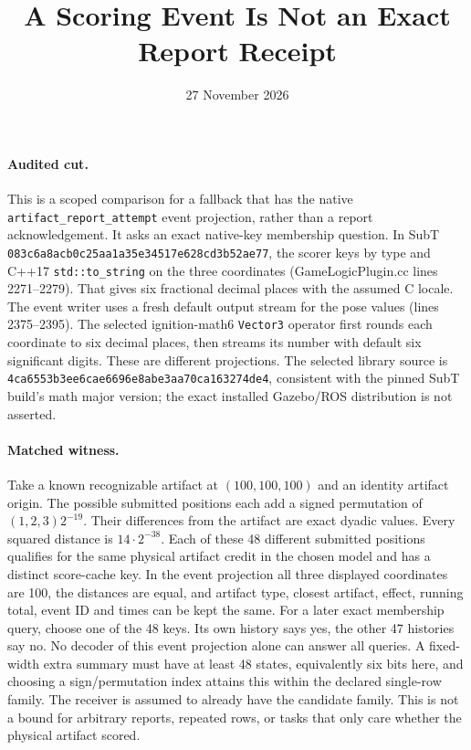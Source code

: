 \documentclass[11pt]{article}
\title{A Scoring Event Is Not an Exact Report Receipt}
\date{27 November 2026}
\begin{document}
\maketitle
\paragraph{Audited cut.} This is a scoped comparison for a
fallback that has the native \texttt{artifact\_report\_attempt}
event projection, rather than a report acknowledgement. It asks
an exact native-key membership question. In SubT
\texttt{083c6a8acb0c25aa1a35e34517e628cd3b52ae77}, the scorer keys
by type and C++17 \texttt{std::to\_string} on the three coordinates
(GameLogicPlugin.cc lines 2271--2279). That gives six fractional
decimal places with the assumed C locale. The event writer uses a
fresh default output stream for the pose values (lines 2375--2395).
The selected ignition-math6 \texttt{Vector3} operator first rounds
each coordinate to six decimal places, then streams its number
with default six significant digits. These are different
projections. The selected library source is
\texttt{4ca6553b3ee6cae6696e8abe3aa70ca163274de4}, consistent with
the pinned SubT build's math major version; the exact installed
Gazebo/ROS distribution is not asserted.

\paragraph{Matched witness.} Take a known recognizable artifact
at $(100,100,100)$ and an identity artifact origin. The possible
submitted positions each add a signed permutation of
$(1,2,3)2^{-19}$. Their differences from the artifact are exact
dyadic values. Every squared distance is $14\cdot 2^{-38}$.
Each of these 48 different submitted positions qualifies for the
same physical artifact credit in the chosen model and has a
distinct score-cache key. In the event projection all three
displayed coordinates are 100, the distances are equal, and
artifact type, closest artifact, effect, running total, event ID
and times can be kept the same. For a later exact membership
query, choose one of the 48 keys. Its own history says yes, the
other 47 histories say no. No decoder of this event projection
alone can answer all queries. A fixed-width extra summary must
have at least 48 states, equivalently six bits here, and choosing a
sign/permutation index attains this within the declared single-row
family. The receiver is assumed to already have the candidate
family. This is not a bound for arbitrary reports, repeated rows,
or tasks that only care whether the physical artifact scored.
\end{document}

